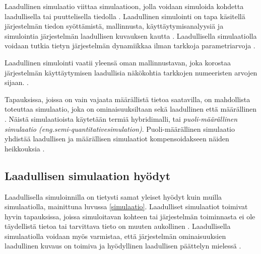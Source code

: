 \documentclass[utf8]{gradu3}
\begin{document}
Laadullinen simulaatio viittaa simulaatioon, jolla voidaan simuloida kohdetta
laadullisella tai puuttelisella tiedolla \parencite{kuipers1986qualitative}.
Laadullinen simulointi on tapa käsitellä järjestelmän tiedon syöttämistä, 
mallinnusta, käyttäytymisanalyysiä ja simulointia järjestelmän 
laadullisen kuvauksen kautta \parencite{QualSimTheoryApplications2013}.
Laadullisella simulaatiolla voidaan tutkia tietyn järjestelmän dynamiikkaa 
ilman tarkkoja parametriarvoja \parencite{cosme2023history}. 

Laadullinen simulointi vaatii yleensä oman mallinnustavan, 
joka korostaa järjestelmän käyttäytymisen laadullisia näkökohtia 
tarkkojen numeeristen arvojen sijaan. 
%
\parencites%
  {parallelQualitativeSimulation1997}%
  {kuipers1986qualitative}%
\relax.
%

Tapauksissa, joissa on vain vajaata määrällistä tietoa saatavilla,
on mahdollista toteuttaa simulaatio, 
joka on ominaisuuksiltaan sekä laadullinen että määrällinen 
\parencite{semiHybrid1997qualitative}. 
Näistä simulaatioista käytetään termiä hybridimalli, tai
\textit{ puoli-määrällinen simulaatio 
(eng.semi-quantitativesimulation)}. 
Puoli-määrällinen simulaatio yhdistää laadullisen ja määrällisen simulaatiot
kompensoidakseen näiden heikkouksia \parencite{semiHybrid1997qualitative}.

\subsection{Laadullisen simulaation hyödyt}
\begin{comment}
Jo määrällisessäkin simuloinnissa on usein tarve mm herkkyysanalyysille, jolla arvioidaan eri parametreissa olevien epävarmuuksien vaikutusta tulosmuuttujiin (ja joskus tämä on määrällisen simuloinnin tavoitekin). 
Vastaavasti tästä voi johtaa laadullisen tulosen sille, onko jonkin parametrin tai ilmiön tarkempi kuvaus tarpeen vai voiko rauhassa yksinkertaistaa.
\end{comment}
Laadullisella simuloinnilla on tietysti samat yleiset hyödyt 
kuin muilla simulaatiolla, mainittuna luvussa \ref{simulaatio}. 
Laadulliset simulaatiot toimivat hyvin tapauksissa, 
joissa simuloitavan kohteen tai järjestelmän toiminnasta 
ei ole täydellistä tietoa tai tarvittava tieto on 
muuten aukollinen \parencite{kuipers1986qualitative}. 
Laadullisella simulaatiolla voidaan myös varmistaa, että järjestelmän
ominaisuuksien laadullinen kuvaus on toimiva ja hyödyllinen 
laadullisen päättelyn mielessä \parencite{kuipers1986qualitative}.
\end{document}
